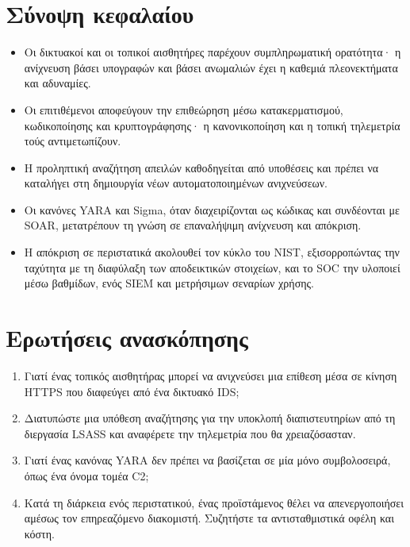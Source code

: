 \section*{Σύνοψη κεφαλαίου}
\begin{itemize}
  \item Οι δικτυακοί και οι τοπικοί αισθητήρες παρέχουν συμπληρωματική ορατότητα· η ανίχνευση βάσει υπογραφών και βάσει ανωμαλιών έχει η καθεμιά πλεονεκτήματα και αδυναμίες.
  \item Οι επιτιθέμενοι αποφεύγουν την επιθεώρηση μέσω κατακερματισμού, κωδικοποίησης και κρυπτογράφησης· η κανονικοποίηση και η τοπική τηλεμετρία τούς αντιμετωπίζουν.
  \item Η προληπτική αναζήτηση απειλών καθοδηγείται από υποθέσεις και πρέπει να καταλήγει στη δημιουργία νέων αυτοματοποιημένων ανιχνεύσεων.
  \item Οι κανόνες YARA και Sigma, όταν διαχειρίζονται ως κώδικας και συνδέονται με SOAR, μετατρέπουν τη γνώση σε επαναλήψιμη ανίχνευση και απόκριση.
  \item Η απόκριση σε περιστατικά ακολουθεί τον κύκλο του NIST, εξισορροπώντας την ταχύτητα με τη διαφύλαξη των αποδεικτικών στοιχείων, και το SOC την υλοποιεί μέσω βαθμίδων, ενός SIEM και μετρήσιμων σεναρίων χρήσης.
\end{itemize}

\section*{Ερωτήσεις ανασκόπησης}
\begin{enumerate}
  \item Γιατί ένας τοπικός αισθητήρας μπορεί να ανιχνεύσει μια επίθεση μέσα σε κίνηση HTTPS που διαφεύγει από ένα δικτυακό IDS;
  \item Διατυπώστε μια υπόθεση αναζήτησης για την υποκλοπή διαπιστευτηρίων από τη διεργασία LSASS και αναφέρετε την τηλεμετρία που θα χρειαζόσασταν.
  \item Γιατί ένας κανόνας YARA δεν πρέπει να βασίζεται σε μία μόνο συμβολοσειρά, όπως ένα όνομα τομέα C2;
  \item Κατά τη διάρκεια ενός περιστατικού, ένας προϊστάμενος θέλει να απενεργοποιήσει αμέσως τον επηρεαζόμενο διακομιστή. Συζητήστε τα αντισταθμιστικά οφέλη και κόστη.
\end{enumerate}
